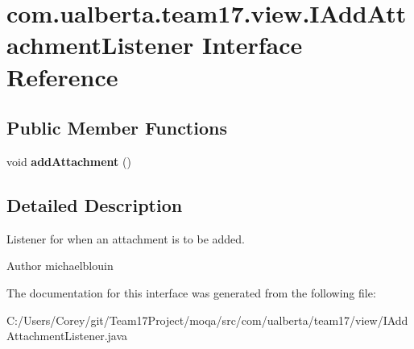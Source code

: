 \hypertarget{interfacecom_1_1ualberta_1_1team17_1_1view_1_1_i_add_attachment_listener}{\section{com.\+ualberta.\+team17.\+view.\+I\+Add\+Attachment\+Listener Interface Reference}
\label{interfacecom_1_1ualberta_1_1team17_1_1view_1_1_i_add_attachment_listener}
}
\subsection*{Public Member Functions}
\begin{DoxyCompactItemize}
\item 
\hypertarget{interfacecom_1_1ualberta_1_1team17_1_1view_1_1_i_add_attachment_listener_a197eedee7862aad72e14a966e92e10c9}{void {\bfseries add\+Attachment} ()}\label{interfacecom_1_1ualberta_1_1team17_1_1view_1_1_i_add_attachment_listener_a197eedee7862aad72e14a966e92e10c9}

\end{DoxyCompactItemize}


\subsection{Detailed Description}
Listener for when an attachment is to be added. \begin{DoxyAuthor}{Author}
michaelblouin 
\end{DoxyAuthor}


The documentation for this interface was generated from the following file\+:\begin{DoxyCompactItemize}
\item 
C\+:/\+Users/\+Corey/git/\+Team17\+Project/moqa/src/com/ualberta/team17/view/I\+Add\+Attachment\+Listener.\+java\end{DoxyCompactItemize}
